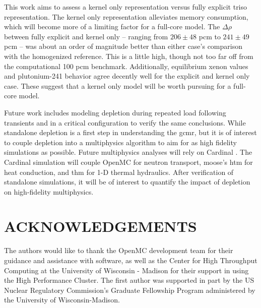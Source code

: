 \documentclass[letterpaper]{physor2024}
\begin{document}
This work aims to assess a kernel only representation versus fully explicit \gls{triso} representation. The kernel only representation alleviates memory consumption, which will become more of a limiting factor for a full-core model. The $\Delta \rho$ between fully explicit and kernel only -- ranging from $206\pm48$ \gls{pcm} to $241\pm49$ \gls{pcm} -- was about an order of magnitude better than either case's comparison with the homogenized reference. This is a little high, though not too far off from the computational 100 \gls{pcm} benchmark. Additionally, equilibrium xenon values and plutonium-241 behavior agree decently well for the explicit and kernel only case. These suggest that a kernel only model will be worth pursuing for a full-core model.

Future work includes modeling depletion during repeated load following transients and in a critical configuration to verify the same conclusions. While standalone depletion is a first step in understanding the \gls{gcmr}, but it is of interest to couple depletion into a multiphysics algorithm to aim for as high fidelity simulations as possible. Future multiphysics analyses will rely on Cardinal \cite{novak2022-cardinal}. The Cardinal simulation will couple OpenMC for neutron transport, \gls{moose}'s \gls{htm} for heat conduction, and \gls{thm} for 1-D thermal hydraulics. After verification of standalone simulations, it will be of interest to quantify the impact of depletion on high-fidelity multiphysics.

\section*{ACKNOWLEDGEMENTS}
The authors would like to thank the OpenMC development team for their guidance and assistance with software, as well as the Center for High Throughput Computing at the University of Wisconsin - Madison for their support in using the High Performance Cluster. The first author was supported in part by the US Nuclear Regulatory Commission's Graduate Fellowship Program administered by the University of Wisconsin-Madison.




\end{document}
